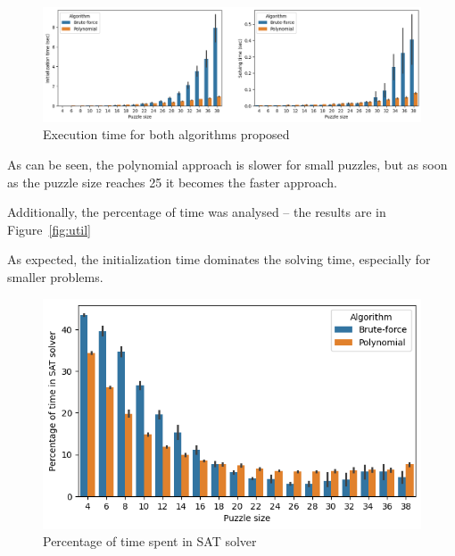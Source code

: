 \documentclass[12pt]{article}
\begin{document}
\begin{figure}[h]
  \includegraphics[scale=0.5]{bench.png}
  \centering
  \caption{Execution time for both algorithms proposed}
  \label{fig:bench}
\end{figure}

As can be seen, the polynomial approach is slower for small puzzles, but as soon as the puzzle size reaches 25 it becomes the faster approach.

Additionally, the percentage of time was analysed -- the results are in Figure~\ref{fig:util}

As expected, the initialization time dominates the solving time, especially for smaller problems.

\begin{figure}[h]
  \includegraphics[scale=0.5]{util.png}
  \centering
  \caption{Percentage of time spent in SAT solver}
  \label{fig:bench}
\end{figure}


\end{document}
